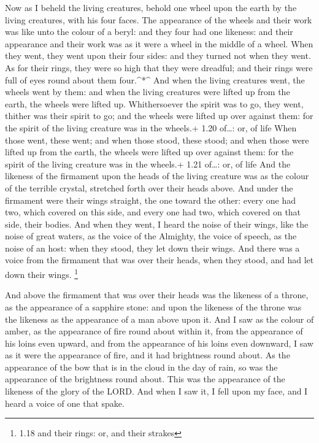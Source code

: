  Now as I beheld the living creatures, behold one wheel
upon the earth by the living creatures, with his four faces.
 The appearance of the wheels and their work was like unto
the colour of a beryl: and they four had one likeness: and their
appearance and their work was as it were a wheel in the middle of a
wheel.  When they went, they went upon their four sides:
and they turned not when they went.  As for their rings,
they were so high that they were dreadful; and their rings were full of
eyes round about them four.\^{}*\^{}  And when the living
creatures went, the wheels went by them: and when the living creatures
were lifted up from the earth, the wheels were lifted up. 
Whithersoever the spirit was to go, they went, thither was their spirit
to go; and the wheels were lifted up over against them: for the spirit
of the living creature was in the wheels.+ 1.20 of\ldots: or, of life
 When those went, these went; and when those stood, these
stood; and when those were lifted up from the earth, the wheels were
lifted up over against them: for the spirit of the living creature was
in the wheels.+ 1.21 of\ldots: or, of life  And the
likeness of the firmament upon the heads of the living creature was as
the colour of the terrible crystal, stretched forth over their heads
above.  And under the firmament were their wings straight,
the one toward the other: every one had two, which covered on this side,
and every one had two, which covered on that side, their bodies.
 And when they went, I heard the noise of their wings, like
the noise of great waters, as the voice of the Almighty, the voice of
speech, as the noise of an host: when they stood, they let down their
wings.  And there was a voice from the firmament that was
over their heads, when they stood, and had let down their wings.
\footnote{1.18 and their rings: or, and their strakes}

 And above the firmament that was over their heads was the
likeness of a throne, as the appearance of a sapphire stone: and upon
the likeness of the throne was the likeness as the appearance of a man
above upon it.  And I saw as the colour of amber, as the
appearance of fire round about within it, from the appearance of his
loins even upward, and from the appearance of his loins even downward, I
saw as it were the appearance of fire, and it had brightness round
about.  As the appearance of the bow that is in the cloud
in the day of rain, so was the appearance of the brightness round about.
This was the appearance of the likeness of the glory of the LORD. And
when I saw it, I fell upon my face, and I heard a voice of one that
spake.

